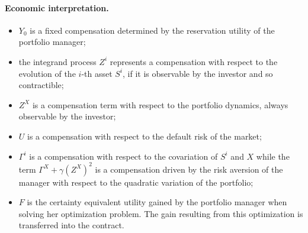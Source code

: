 \documentclass[11pt,a4paper]{article}
\theoremstyle{thmstyleone}%
\theoremstyle{thmstyletwo}%
\theoremstyle{thmstylethree}%
\begin{document}
  

    \paragraph{Economic interpretation.} 

    \begin{itemize}
        \item $Y_0$ is a fixed compensation determined by the reservation utility of the portfolio manager;
        \item the integrand process $Z^i$ represents a compensation with respect to the evolution of the $i$-th asset $S^i$, if it is observable by the investor and so contractible;
        \item $Z^X$ is a compensation term with respect to the portfolio dynamics, always observable by the investor;
        \item $U$ is a compensation with respect to the default risk of the market;
        \item $\Gamma^i$ is a compensation with respect to the covariation of $S^i$ and $X$ while the term $\Gamma^X+\gamma(Z^X)^2$ is a compensation driven by the risk aversion of the manager with respect to the quadratic variation of the portfolio;
        \item $F$ is the certainty equivalent utility gained by the portfolio manager when solving her optimization problem. The gain resulting from this optimization is transferred into the contract.
    \end{itemize}
\end{document}
